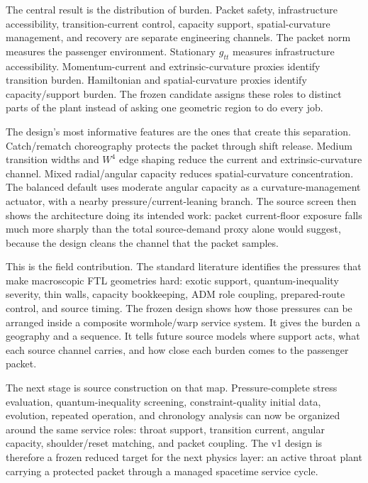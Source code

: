 \documentclass[11pt]{article}
\begin{document}
The central result is the distribution of burden. Packet safety, infrastructure accessibility, transition-current control, capacity support, spatial-curvature management, and recovery are separate engineering channels. The packet norm measures the passenger environment. Stationary $g_{tt}$ measures infrastructure accessibility. Momentum-current and extrinsic-curvature proxies identify transition burden. Hamiltonian and spatial-curvature proxies identify capacity/support burden. The frozen candidate assigns these roles to distinct parts of the plant instead of asking one geometric region to do every job.

The design's most informative features are the ones that create this separation. Catch/rematch choreography protects the packet through shift release. Medium transition widths and $W^4$ edge shaping reduce the current and extrinsic-curvature channel. Mixed radial/angular capacity reduces spatial-curvature concentration. The balanced default uses moderate angular capacity as a curvature-management actuator, with a nearby pressure/current-leaning branch. The source screen then shows the architecture doing its intended work: packet current-floor exposure falls much more sharply than the total source-demand proxy alone would suggest, because the design cleans the channel that the packet samples.

This is the field contribution. The standard literature identifies the pressures that make macroscopic FTL geometries hard: exotic support, quantum-inequality severity, thin walls, capacity bookkeeping, ADM role coupling, prepared-route control, and source timing. The frozen design shows how those pressures can be arranged inside a composite wormhole/warp service system. It gives the burden a geography and a sequence. It tells future source models where support acts, what each source channel carries, and how close each burden comes to the passenger packet.

The next stage is source construction on that map. Pressure-complete stress evaluation, quantum-inequality screening, constraint-quality initial data, evolution, repeated operation, and chronology analysis can now be organized around the same service roles: throat support, transition current, angular capacity, shoulder/reset matching, and packet coupling. The v1 design is therefore a frozen reduced target for the next physics layer: an active throat plant carrying a protected packet through a managed spacetime service cycle.



\end{document}
